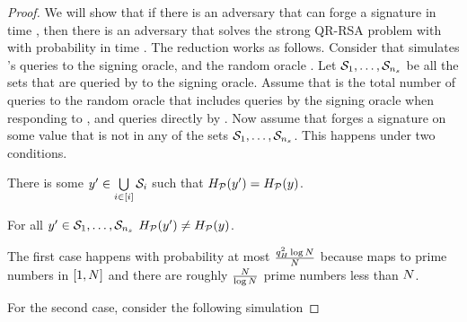 \begin{proof}
We will show that if there is an adversary \ufcmaAdversary that can forge a signature in time 
\timeBound, then there is an adversary \rsaAdversary that solves the strong QR-RSA problem with 
with probability \rsaAdv in time \timeBound.
The reduction works as follows. Consider that 
\rsaAdversary simulates \ufcmaAdversary's queries to the 
signing oracle, and the random oracle \primeRO. Let $\genericSetVar[1], \dots, 
\genericSetVar[\numberOfSetsQueried]$  be all the sets that are queried by \ufcmaAdversary 
to the signing oracle. Assume that \oracleQueries is the total number of queries to the random 
oracle that includes queries by the signing oracle when responding to \ufcmaAdversary, and 
queries directly by \ufcmaAdversary. Now assume that \ufcmaAdversary forges a signature on 
some value \genericFnOutput that is not in any of the sets $\genericSetVar[1], \dots, 
\genericSetVar[\numberOfSetsQueried]$. This happens under two conditions.


\enumListStart
	\item There is some $\genericFnOutputAlt \in \bigcup\limits_{\setIdx \in \nats[i]} \genericSetVar[i]$ such that $\primeRO(\genericFnOutputAlt) = 
	\primeRO(\genericFnOutput)$.
	
	\item For all  $\genericFnOutputAlt \in \genericSetVar[1], \dots, 
	\genericSetVar[\numberOfSetsQueried]$  $\primeRO(\genericFnOutputAlt) \neq
	\primeRO(\genericFnOutput)$.
\enumListEnd

The first case happens with probability at most $\frac{q_H^2 \log N}{N}$ 
because \primeRO maps to prime numbers in $[1, N]$ and there are roughly 
 $\frac{N}{\log N}$ prime numbers less than $N$. 

For the second case, consider the following simulation

\enumListStart
	

\end{proof}
